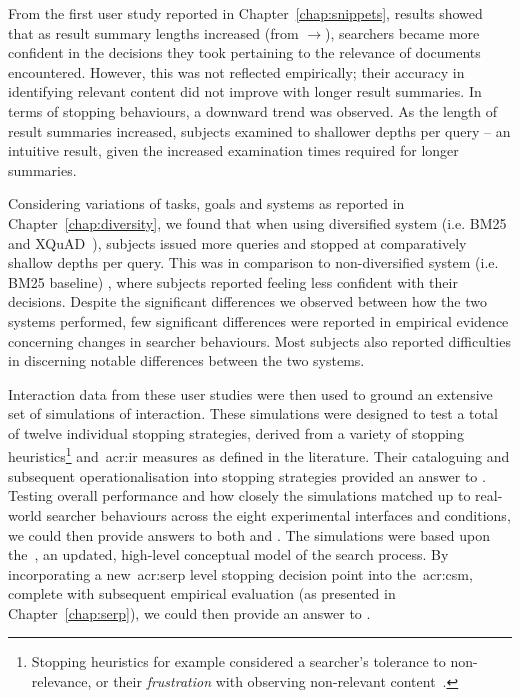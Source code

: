 From the first user study reported in Chapter~\ref{chap:snippets}, results showed that as result summary lengths increased (from $\rightarrow$), searchers became more confident in the decisions they took pertaining to the relevance of documents encountered. However, this was not reflected empirically; their accuracy in identifying relevant content did not improve with longer result summaries. In terms of stopping behaviours, a downward trend was observed. As the length of result summaries increased, subjects examined to shallower depths per query -- an intuitive result, given the increased examination times required for longer summaries.

Considering variations of tasks, goals and systems as reported in Chapter~\ref{chap:diversity}, we found that when using diversified system  (i.e. BM25 and XQuAD~\citep{santos2010query_reformulations_diversification}), subjects issued more queries and stopped at comparatively shallow depths per query. This was in comparison to non-diversified system (i.e. BM25 baseline) , where subjects reported feeling less confident with their decisions. Despite the significant differences we observed between how the two systems performed, few significant differences were reported in empirical evidence concerning changes in searcher behaviours. Most subjects also reported difficulties in discerning notable differences between the two systems.

Interaction data from these user studies were then used to ground an extensive set of simulations of interaction. These simulations were designed to test a total of twelve individual stopping strategies, derived from a variety of stopping heuristics\footnote{Stopping heuristics for example considered a searcher's tolerance to non-relevance, or their \emph{frustration} with observing non-relevant content~\citep{kraft1979stopping_rules}.} and~\gls{acr:ir} measures as defined in the literature. Their cataloguing and subsequent operationalisation into stopping strategies provided an answer to . Testing overall performance and how closely the simulations matched up to real-world searcher behaviours across the eight experimental interfaces and conditions, we could then provide answers to both  and . The simulations were based upon the~, an updated, high-level conceptual model of the search process. By incorporating a new~\gls{acr:serp} level stopping decision point into the~\gls{acr:csm}, complete with subsequent empirical evaluation (as presented in Chapter~\ref{chap:serp}), we could then provide an answer to .

